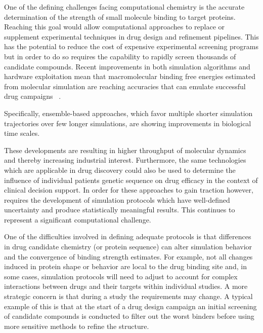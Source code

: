 One of the defining challenges facing computational chemistry is the accurate 
determination of the strength of small molecule binding to target proteins.
Reaching this goal would allow computational approaches to replace or supplement
experimental techniques in drug design and refinement pipelines.
This has the potential to reduce the cost of expensive experimental screening 
programs but in order to do so requires the capability to rapidly screen 
thousands of candidate compounds. 
Recent improvements in both simulation algorithms and hardware exploitation 
mean that macromolecular binding free energies estimated from molecular simulation 
are reaching accuracies that can emulate successful drug campaigns 
~\cite{DeVivo2016}. 

Specifically, ensemble-based approaches, which favor multiple shorter simulation 
trajectories over few longer simulations, are showing improvements in biological 
time scales. 


These developments are resulting in higher throughput of molecular dynamics and
thereby increasing industrial interest.
Furthermore, the same technologies which are applicable in drug discovery 
could also be used to determine the influence of individual patients genetic 
sequence on drug efficacy in the context of clinical decision support.
In order for these approaches to gain traction however, requires the development 
of simulation protocols which have well-defined uncertainty and 
produce statistically meaningful results.
This continues to represent a significant computational challenge. 

One of the difficulties involved in defining adequate protocols is that 
differences in drug candidate chemistry (or protein sequence) can alter 
simulation behavior and the convergence of binding strength estimates.
For example, not all changes induced in protein shape or behavior are local 
to the drug binding site and, in some cases, simulation protocols will need to 
adjust to account for complex interactions between drugs and their targets 
within individual studies.
A more strategic concern is that during a study the requirements may change. 
A typical example of this is that at the start of a drug design campaign
an initial screening of candidate compounds is conducted to filter out the worst 
binders before using more sensitive methods to refine the structure.

